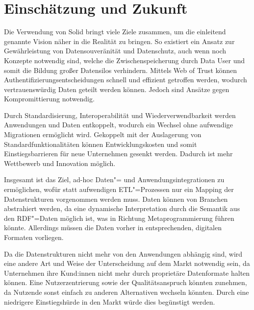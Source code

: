 
\section{Einschätzung und Zukunft}

Die Verwendung von Solid bringt viele Ziele zusammen, um die einleitend genannte Vision näher in die Realität zu bringen.
So existiert ein Ansatz zur Gewährleistung von Datensouveränität und Datenschutz, auch wenn noch Konzepte notwendig sind, welche die Zwischenspeicherung durch Data User und somit die Bildung großer Datensilos verhindern.
Mittels Web of Trust können Authentifizierungsentscheidungen schnell und effizient getroffen werden, wodurch vertrauenswürdig Daten geteilt werden können.
Jedoch sind Ansätze gegen Kompromittierung notwendig.

Durch Standardisierung, Interoperabilität und Wiederverwendbarkeit werden Anwendungen und Daten entkoppelt, wodurch ein Wechsel ohne aufwendige Migrationen ermöglicht wird.
Gekoppelt mit der Auslagerung von Standardfunktionalitäten können Entwicklungskosten und somit Einstiegsbarrieren für neue Unternehmen gesenkt werden.
Dadurch ist mehr Wettbewerb und Innovation möglich.

Insgesamt ist das Ziel, ad-hoc Daten"= und Anwendungsintegrationen zu ermöglichen, wofür statt aufwendigen ETL"=Prozessen nur ein Mapping der Datenstrukturen vorgenommen werden muss.
Daten können von Branchen abstrahiert werden, da eine dynamische Interpretation durch die Semantik aus den RDF"=Daten möglich ist, was in Richtung Metaprogrammierung führen könnte.
Allerdings müssen die Daten vorher in entsprechenden, digitalen Formaten vorliegen.

Da die Datenstrukturen nicht mehr von den Anwendungen abhängig sind, wird eine andere Art und Weise der Unterscheidung auf dem Markt notwendig sein, da Unternehmen ihre Kund:innen nicht mehr durch proprietäre Datenformate halten können.
Eine Nutzerzentrierung sowie der Qualitätsanspruch könnten zunehmen, da Nutzende sonst einfach zu anderen Alternativen wechseln könnten.
Durch eine niedrigere Einstiegshürde in den Markt würde dies begünstigt werden.

